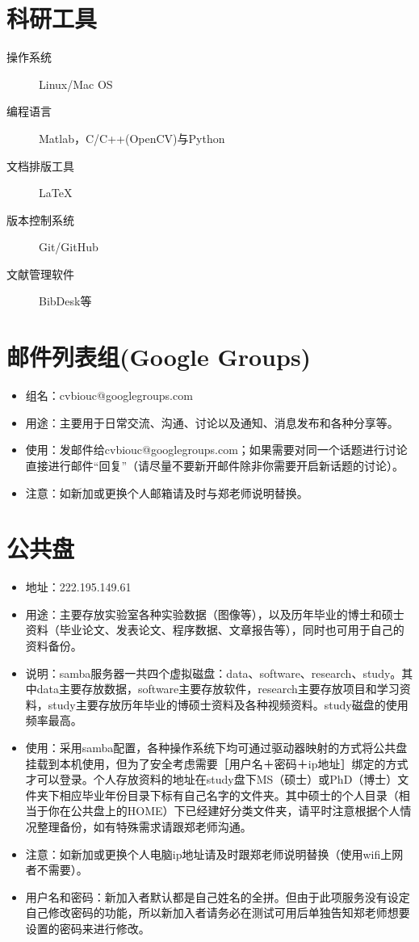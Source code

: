 \documentclass[a4paper，12pt]{article}
\begin{document}
\section{科研工具}

\begin{description}
\item[操作系统] Linux/Mac OS
\item[编程语言] Matlab，C/C++(OpenCV)与Python
\item[文档排版工具] \LaTeX
\item[版本控制系统] Git/GitHub
\item[文献管理软件] BibDesk等
\end{description}

\section{邮件列表组(Google Groups)}

\begin{itemize}
\item 组名：cvbiouc@googlegroups.com
\item 用途：主要用于日常交流、沟通、讨论以及通知、消息发布和各种分享等。
\item 使用：发邮件给cvbiouc@googlegroups.com；如果需要对同一个话题进行讨论直接进行邮件“回复”（请尽量不要新开邮件除非你需要开启新话题的讨论）。
\item 注意：如新加或更换个人邮箱请及时与郑老师说明替换。
\end{itemize}

\section{公共盘}

\begin{itemize}
\item 地址：222.195.149.61
\item 用途：主要存放实验室各种实验数据（图像等），以及历年毕业的博士和硕士资料（毕业论文、发表论文、程序数据、文章报告等），同时也可用于自己的资料备份。
\item 说明：samba服务器一共四个虚拟磁盘：data、software、research、study。其中data主要存放数据，software主要存放软件，research主要存放项目和学习资料，study主要存放历年毕业的博硕士资料及各种视频资料。study磁盘的使用频率最高。
\item 使用：采用samba配置，各种操作系统下均可通过驱动器映射的方式将公共盘挂载到本机使用，但为了安全考虑需要［用户名＋密码＋ip地址］绑定的方式才可以登录。个人存放资料的地址在study盘下MS（硕士）或PhD（博士）文件夹下相应毕业年份目录下标有自己名字的文件夹。其中硕士的个人目录（相当于你在公共盘上的HOME）下已经建好分类文件夹，请平时注意根据个人情况整理备份，如有特殊需求请跟郑老师沟通。
\item 注意：如新加或更换个人电脑ip地址请及时跟郑老师说明替换（使用wifi上网者不需要）。
\item 用户名和密码：新加入者默认都是自己姓名的全拼。但由于此项服务没有设定自己修改密码的功能，所以新加入者请务必在测试可用后单独告知郑老师想要设置的密码来进行修改。
\end{itemize}
\end{document}
